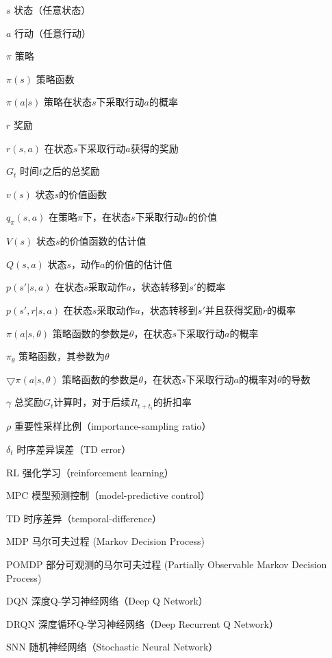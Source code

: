 \begin{denotation}[3cm]
\item[$s$] 状态（任意状态）
\item[$a$] 行动（任意行动）
\item[$\pi$] 策略
\item[$\pi(s)$] 策略函数
\item[$\pi(a|s)$] 策略在状态$s$下采取行动$a$的概率
\item[$r$] 奖励
\item[$r(s, a)$] 在状态$s$下采取行动$a$获得的奖励
\item[$G_t$] 时间$t$之后的总奖励
\item[$v(s)$] 状态$s$的价值函数
\item[$q_\pi(s, a)$] 在策略$\pi$下，在状态$s$下采取行动$a$的价值
\item[$V(s)$] 状态$s$的价值函数的估计值
\item[$Q(s, a)$] 状态$s$，动作$a$的价值的估计值
\item[$p(s'|s, a)$] 在状态$s$采取动作$a$，状态转移到$s'$的概率
\item[$p(s', r|s, a)$] 在状态$s$采取动作$a$，状态转移到$s'$并且获得奖励$r$的概率
\item[$\pi(a|s, \theta)$] 策略函数的参数是$\theta$，在状态$s$下采取行动$a$的概率
\item[$\pi_\theta$] 策略函数，其参数为$\theta$
\item[$\bigtriangledown \pi(a|s, \theta)$] 策略函数的参数是$\theta$，在状态$s$下采取行动$a$的概率对$\theta$的导数
\item[$\gamma$] 总奖励$G_t$计算时，对于后续$R_{t+t_i}$的折扣率
\item[$\rho$] 重要性采样比例（importance-sampling ratio）
\item[$\delta_t$] 时序差异误差（TD error）
\item[RL] 强化学习（reinforcement learning）
\item[MPC] 模型预测控制（model-predictive control）
\item[TD] 时序差异（temporal-difference）
\item[MDP] 马尔可夫过程 (Markov Decision Process)
\item[POMDP] 部分可观测的马尔可夫过程 (Partially Observable Markov Decision Process)
\item[DQN] 深度Q-学习神经网络（Deep Q Network）
\item[DRQN] 深度循环Q-学习神经网络（Deep Recurrent Q Network）
\item[SNN] 随机神经网络（Stochastic Neural Network）
\end{denotation}
